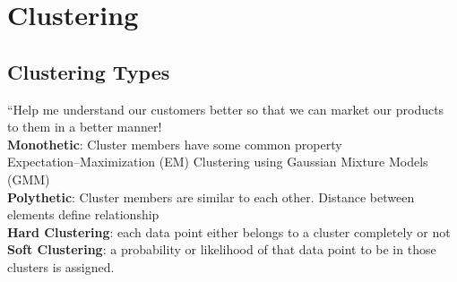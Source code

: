 \documentclass{beamer}
\begin{document}
\section{Clustering}
\subsection{Clustering Types}
\begin{frame}
	“Help me understand our customers better so that we can market our products to them in a better manner!\\
	\textbf{Monothetic}: Cluster members have some common property\\
	Expectation–Maximization (EM) Clustering using Gaussian Mixture Models (GMM)\\
	\textbf{Polythetic}: Cluster members are similar to each other. Distance between elements define relationship\\
	\textbf{Hard Clustering}: each data point either belongs to a cluster completely or not\\
	\textbf{Soft Clustering}: a probability or likelihood of that data point to be in those clusters is assigned.
\end{frame}

\begingroup
\tiny
\end{document}
